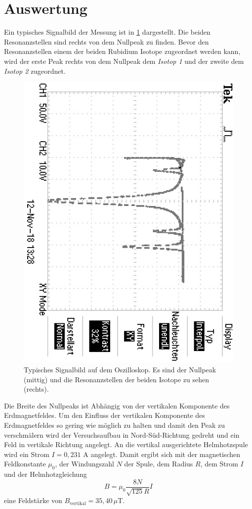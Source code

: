 \section{Auswertung}
\label{sec:Auswertung}
Ein typisches Signalbild der Messung ist in \ref{fig:Signal} dargestellt. Die beiden
Resonanzstellen sind rechts von dem Nullpeak zu finden. Bevor den Resonanzstellen einem
der beiden Rubidium Isotope zugeordnet werden kann, wird der erste Peak rechts von dem Nullpeak
dem \textit{Isotop 1} und der zweite dem  \textit{Isotop 2} zugeordnet.
\begin{figure}
  \centering
  \includegraphics[angle=90]{pics/TEK0000.JPG}
  \caption{Typisches Signalbild auf dem Oszilloskop. Es sind der Nullpeak (mittig) und
           die Resonanzstellen der beiden Isotope zu sehen (rechts).}
  \label{fig:Signal}
\end{figure}
Die Breite des Nullpeaks ist Abhängig von der vertikalen Komponente des Erdmagnetfeldes.
Um den Einfluss der vertikalen Komponente des Erdmagnetfeldes so gering wie möglich zu halten
und damit den Peak zu verschmälern wird der Versuchsaufbau in Nord-Süd-Richtung gedreht und ein
Feld in vertikale Richtung angelegt.
An die vertikal ausgerichtete Helmhotzspule wird ein Strom $I= 0,231$ A angelegt. Damit
ergibt sich mit der magnetischen Feldkonstante $\mu_{0}$, der Windungszahl $N$ der Spule,
dem Radius $R$, dem Strom $I$ und der Helmhotzgleichung
\begin{equation}
  B=\mu_{0}\frac{8 N }{\sqrt{125} R}I
\end{equation} eine Feldstärke von $B_{\text{vertikal}}=35,40\,\mu$T.
